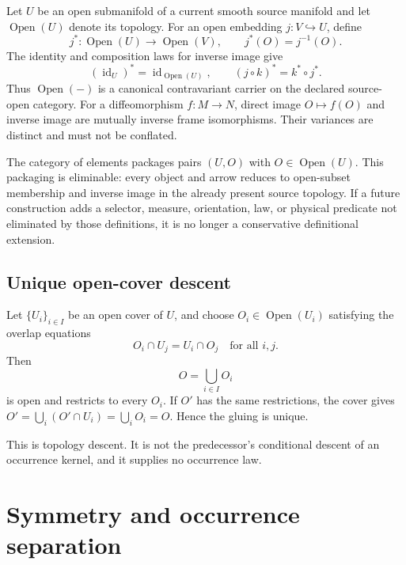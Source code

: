 \documentclass[11pt]{article}
\newcommand{\Open}{\operatorname{Open}}
\begin{document}
Let \(U\) be an open submanifold of a current smooth source manifold and let
\(\Open(U)\) denote its topology. For an open embedding
\(j:V\hookrightarrow U\), define
\begin{equation}
  j^*: \Open(U)\longrightarrow\Open(V),\qquad j^*(O)=j^{-1}(O).
  \label{eq:restriction}
\end{equation}
The identity and composition laws for inverse image give
\begin{equation}
  (\operatorname{id}_U)^*=\operatorname{id}_{\Open(U)},\qquad
  (j\circ k)^*=k^*\circ j^*.
\end{equation}
Thus \(\Open(-)\) is a canonical contravariant carrier on the declared
source-open category. For a diffeomorphism \(f:M\to N\), direct image
\(O\mapsto f(O)\) and inverse image are mutually inverse frame
isomorphisms. Their variances are distinct and must not be conflated.

The category of elements packages pairs \((U,O)\) with
\(O\in\Open(U)\). This packaging is eliminable: every object and arrow
reduces to open-subset membership and inverse image in the already present
source topology. If a future construction adds a selector, measure,
orientation, law, or physical predicate not eliminated by those definitions,
it is no longer a conservative definitional extension.

\subsection{Unique open-cover descent}

Let \(\{U_i\}_{i\in I}\) be an open cover of \(U\), and choose
\(O_i\in\Open(U_i)\) satisfying the overlap equations
\begin{equation}
 O_i\cap U_j=U_i\cap O_j
 \quad\text{for all }i,j.
 \label{eq:compatibility}
\end{equation}
Then
\begin{equation}
 O=\bigcup_{i\in I}O_i
 \label{eq:glue}
\end{equation}
is open and restricts to every \(O_i\). If \(O'\) has the same
restrictions, the cover gives
\(O'=\bigcup_i(O'\cap U_i)=\bigcup_iO_i=O\). Hence the gluing is unique.

This is topology descent. It is not the predecessor's conditional descent of
an occurrence kernel, and it supplies no occurrence law.

\section{Symmetry and occurrence separation}
\end{document}
